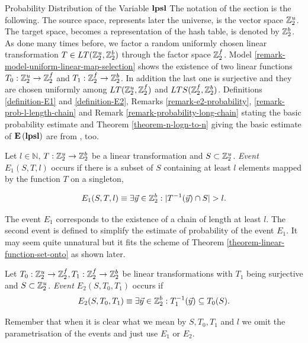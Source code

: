\begin{section}{Probability Distribution of the Variable \texorpdfstring{$\mathbf{lpsl}$}{lpsl}}
The notation of the section is the following. The source space, represents later the universe, is the vector space $\mathbb{Z}_{2}^{u}$. The target space, becomes a representation of the hash table, is denoted by $\mathbb{Z}_{2}^{b}$. As done many times before, we factor a random uniformly chosen linear transformation $T \in LT(\mathbb{Z}_{2}^{u}, \mathbb{Z}_{2}^{b})$ through the factor space $\mathbb{Z}_{2}^{f}$. Model \ref{remark-model-uniform-linear-map-selection} shows the existence of two linear functions $T_0: \mathbb{Z}_{2}^{u} \rightarrow \mathbb{Z}_{2}^{f}$ and $T_1: \mathbb{Z}_{2}^{f} \rightarrow \mathbb{Z}_{2}^{b}$. In addition the last one is surjective and they are chosen uniformly among $LT(\mathbb{Z}_{2}^{u}, \mathbb{Z}_{2}^{f})$ and $LTS(\mathbb{Z}_{2}^{f}, \mathbb{Z}_{2}^{b})$. Definitions \ref{definition-E1} and \ref{definition-E2}, Remarks \ref{remark-e2-probability}, \ref{remark-prob-l-length-chain} and Remark \ref{remark-probability-long-chain} stating the basic probability estimate and Theorem \ref{theorem-n-logn-to-n} giving the basic estimate of $\mathbf{E}\left(\mathbf{lpsl}\right)$ are from \cite{DBLP:books/sp/Mehlhorn84}, too.

\begin{definition}[Event $E_1(S, T, l)$]
\label{definition-E1}
Let $l \in \mathbb{N}$, $T: \mathbb{Z}_{2}^{u} \rightarrow \mathbb{Z}_{2}^{b}$ be a linear transformation and $S \subset \mathbb{Z}_{2}^{u}$. \emph{Event $E_1(S, T, l)$} occurs if there is a subset of $S$ containing at least $l$ elements mapped by the function $T$ on a singleton,

\[ 
	E_1(S, T, l) \equiv \exists \vec{y} \in \mathbb{Z}_{2}^{b}: | T^{-1}(\vec{y}) \cap S | > l \text{.}
\]
\end{definition}
The event $E_1$ corresponds to the existence of a chain of length at least $l$. The second event is defined to simplify the estimate of probability of the event $E_1$. It may seem quite unnatural but it fits the scheme of Theorem \ref{theorem-linear-function-set-onto} as shown later.
\begin{definition}[Event $E_2(S, T_0, T_1)$]
\label{definition-E2}
Let $T_0: \mathbb{Z}_{2}^{u} \rightarrow \mathbb{Z}_{2}^{f}, T_1: \mathbb{Z}_{2}^{f} \rightarrow \mathbb{Z}_{2}^{b}$ be linear transformations with $T_1$ being surjective and $S \subset \mathbb{Z}_{2}^{u}$. \emph{Event $E_2(S, T_0, T_1)$} occurs if
\[
	E_2(S, T_0, T_1) \equiv \exists \vec{y} \in \mathbb{Z}_{2}^{b}: T_1^{-1}(\vec{y}) \subseteq T_0(S) \text{.}
\]
\end{definition}

Remember that when it is clear what we mean by $S, T_0, T_1$ and $l$ we omit the parametrisation of the events and just use $E_1$ or $E_2$.


\end{section}
